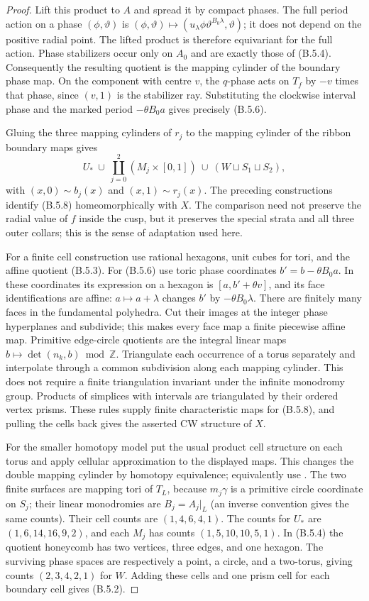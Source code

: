 \begin{proof}
Lift this product to $A$ and spread it by compact phases.
The full period action on a phase $(\phi,\vartheta)$ is
$(\phi,\vartheta)\mapsto
(u_\lambda\phi\vartheta^{B_0\lambda},\vartheta)$;
it does not depend on the positive radial point.  The
lifted product is therefore equivariant for the full
action.  Phase stabilizers occur only on $A_0$ and are
exactly those of (B.5.4).  Consequently the resulting
quotient is the mapping cylinder of the boundary phase
map.  On the component with centre $v$, the $q$-phase
acts on $T_f$ by $-v$ times that phase, since $(v,1)$ is
the stabilizer ray.  Substituting the clockwise interval
phase and the marked period $-\theta B_0a$ gives precisely
(B.5.6).

Gluing the three mapping cylinders of $r_j$ to the
mapping cylinder of the ribbon boundary maps gives
\[
 U_*\ \cup\ \coprod_{j=0}^2(M_j\times[0,1])
       \ \cup\ (W\sqcup S_1\sqcup S_2),
 \tag{B.5.8}
\]
with $(x,0)\sim b_j(x)$ and $(x,1)\sim r_j(x)$.
The preceding constructions identify (B.5.8)
homeomorphically with $X$.  The comparison need not
preserve the radial value of $f$ inside the cusp, but
it preserves the special strata and all three outer
collars; this is the sense of adaptation used here.

For a finite cell construction use rational hexagons,
unit cubes for tori, and the affine quotient (B.5.3).
For (B.5.6) use toric phase coordinates
$b'=b-\theta B_0a$.  In these coordinates its expression
on a hexagon is $[a,b'+\theta v]$, and its face
identifications are affine:
$a\mapsto a+\lambda$ changes $b'$ by
$-\theta B_0\lambda$.  There are finitely many faces
in the fundamental polyhedra.  Cut their images at the
integer phase hyperplanes and subdivide; this makes
every face map a finite piecewise affine map.  Primitive
edge-circle quotients are the integral linear maps
$b\mapsto\det(n_k,b)\bmod\mathbb Z$.
Triangulate each occurrence of a torus separately and
interpolate through a common subdivision along each
mapping cylinder.  This does not require a finite
triangulation invariant under the infinite monodromy
group.  Products of simplices with intervals are
triangulated by their ordered vertex prisms.  These
rules supply finite characteristic maps for (B.5.8),
and pulling the cells back gives the asserted CW
structure of $X$.

For the smaller homotopy model put the usual product
cell structure on each torus and apply cellular
approximation to the displayed maps.  This changes
the double mapping cylinder by homotopy equivalence;
equivalently use \cite[Propositions 4G.1--4G.2]{mapsHatcher02}.
The two finite surfaces are mapping tori of $T_L$,
because $m_j\gamma$ is a primitive circle coordinate
on $S_j$; their linear monodromies are
$B_j=A_j|_L$ (an inverse convention gives the same
counts).  Their cell counts are $(1,4,6,4,1)$.
The counts for $U_*$ are $(1,6,14,16,9,2)$, and
each $M_j$ has counts $(1,5,10,10,5,1)$.
In (B.5.4) the quotient honeycomb has two vertices,
three edges, and one hexagon.  The surviving phase
spaces are respectively a point, a circle, and a
two-torus, giving counts $(2,3,4,2,1)$ for $W$.
Adding these cells and one prism cell for each
boundary cell gives (B.5.2).
\end{proof}


